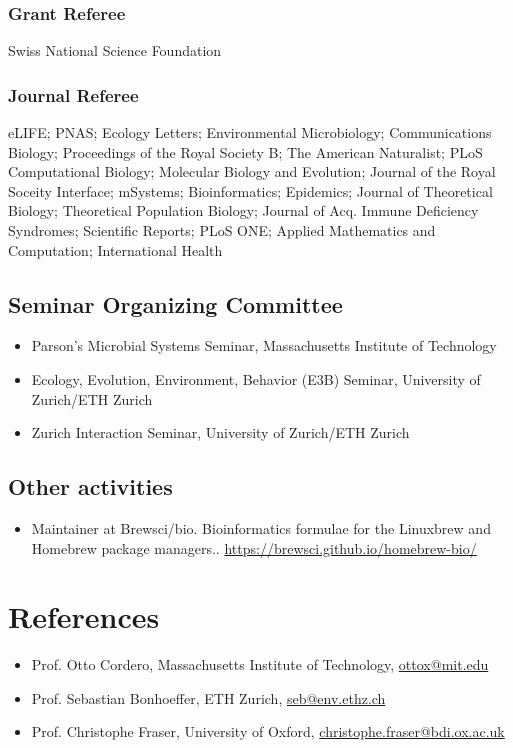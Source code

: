 \documentclass[11pt,a4paper]{article}
\begin{document}
\subsubsection*{Grant Referee}
Swiss National Science Foundation
    
\subsubsection*{Journal Referee}
eLIFE; PNAS; Ecology Letters; Environmental Microbiology; Communications Biology; Proceedings of the Royal Society B; The American Naturalist; PLoS Computational Biology; Molecular Biology and Evolution; Journal of the Royal Soceity Interface; mSystems; Bioinformatics; Epidemics; Journal of Theoretical Biology; Theoretical Population Biology; Journal of Acq. Immune Deficiency Syndromes; Scientific Reports; PLoS ONE; Applied Mathematics and Computation; International Health

\subsection*{Seminar Organizing Committee}
\begin{itemize}[label={},leftmargin=0pt]
  \item Parson's Microbial Systems Seminar, Massachusetts Institute of Technology
  \item Ecology, Evolution, Environment, Behavior (E3B) Seminar, University of Zurich/ETH Zurich
  \item Zurich Interaction Seminar, University of Zurich/ETH Zurich
\end{itemize}

\subsection*{Other activities}
\begin{itemize}[label={},leftmargin=0pt]
  \item%
    Maintainer at Brewsci/bio.
    Bioinformatics formulae for the Linuxbrew and Homebrew package managers..
    \url{https://brewsci.github.io/homebrew-bio/}
\end{itemize}

\section*{References}
\begin{itemize}[label={},leftmargin=0pt]
  \item%
    Prof. Otto Cordero, Massachusetts Institute of Technology, \href{mailto:ottox@mit.edu}{ottox@mit.edu}
  \item%
    Prof. Sebastian Bonhoeffer, ETH Zurich, \href{mailto:seb@env.ethz.ch}{seb@env.ethz.ch}
  \item%
    Prof. Christophe Fraser, University of Oxford, \href{mailto:christophe.fraser@bdi.ox.ac.uk}{christophe.fraser@bdi.ox.ac.uk}
\end{itemize}
\end{document}
